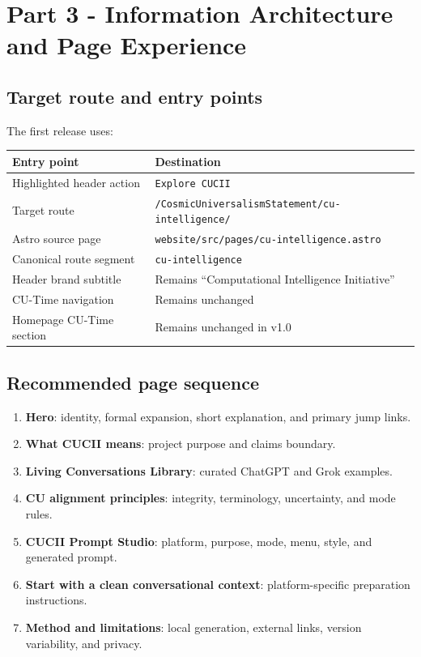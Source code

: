 \documentclass[11pt,letterpaper]{article}
\newcommand{\TargetRoute}{/CosmicUniversalismStatement/cu-intelligence/}
\newcommand{\filepath}[1]{\texttt{#1}}
\begin{document}
\section{Part 3 - Information Architecture and Page Experience}

\subsection{Target route and entry points}

The first release uses:

\begin{tabularx}{\textwidth}{L{2.1in}Y}
\toprule
\textbf{Entry point} & \textbf{Destination} \\
\midrule
Highlighted header action & \texttt{Explore CUCII} \\
Target route & \texttt{\TargetRoute} \\
Astro source page & \filepath{website/src/pages/cu-intelligence.astro} \\
Canonical route segment & \texttt{cu-intelligence} \\
Header brand subtitle & Remains ``Computational Intelligence Initiative'' \\
CU-Time navigation & Remains unchanged \\
Homepage CU-Time section & Remains unchanged in v1.0 \\
\bottomrule
\end{tabularx}

\subsection{Recommended page sequence}

\begin{enumerate}
    \item \textbf{Hero}: identity, formal expansion, short explanation, and primary
          jump links.
    \item \textbf{What CUCII means}: project purpose and claims boundary.
    \item \textbf{Living Conversations Library}: curated ChatGPT and Grok examples.
    \item \textbf{CU alignment principles}: integrity, terminology, uncertainty,
          and mode rules.
    \item \textbf{CUCII Prompt Studio}: platform, purpose, mode, menu, style, and
          generated prompt.
    \item \textbf{Start with a clean conversational context}: platform-specific
          preparation instructions.
    \item \textbf{Method and limitations}: local generation, external links,
          version variability, and privacy.
\end{enumerate}
\end{document}
